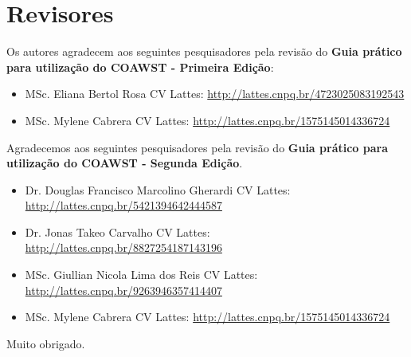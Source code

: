 
\chapter*{Revisores}

\bigskip
\noindent Os autores agradecem aos seguintes pesquisadores pela revisão do \textbf{Guia prático para utilização do COAWST - Primeira Edição}:
\bigskip

\begin{itemize}
    \item MSc. Eliana Bertol Rosa \newline CV Lattes: \textcolor{bleu_cite}{\href{http://lattes.cnpq.br/4723025083192543}{http://lattes.cnpq.br/4723025083192543}}
    \bigskip
    \item MSc. Mylene Cabrera \newline CV Lattes: \textcolor{bleu_cite}{\href{http://lattes.cnpq.br/1575145014336724}{http://lattes.cnpq.br/1575145014336724}}
\end{itemize}

\bigskip
\bigskip
\noindent Agradecemos aos seguintes pesquisadores pela revisão do \textbf{Guia prático para utilização do COAWST - Segunda Edição}.
\bigskip

\begin{itemize}
    \item Dr. Douglas Francisco Marcolino Gherardi \newline CV Lattes: \textcolor{bleu_cite}{\href{http://lattes.cnpq.br/5421394642444587}{http://lattes.cnpq.br/5421394642444587}}
    \bigskip
    \item Dr. Jonas Takeo Carvalho \newline CV Lattes: \textcolor{bleu_cite}{\href{http://lattes.cnpq.br/8827254187143196}{http://lattes.cnpq.br/8827254187143196}}
    \bigskip
    \item MSc. Giullian Nicola Lima dos Reis \newline CV Lattes: \textcolor{bleu_cite}{\href{http://lattes.cnpq.br/9263946357414407}{http://lattes.cnpq.br/9263946357414407}}
    \bigskip
    \item MSc. Mylene Cabrera \newline CV Lattes: \textcolor{bleu_cite}{\href{http://lattes.cnpq.br/1575145014336724}{http://lattes.cnpq.br/1575145014336724}}
\end{itemize}

\begin{flushright}
    Muito obrigado. \\
\end{flushright}